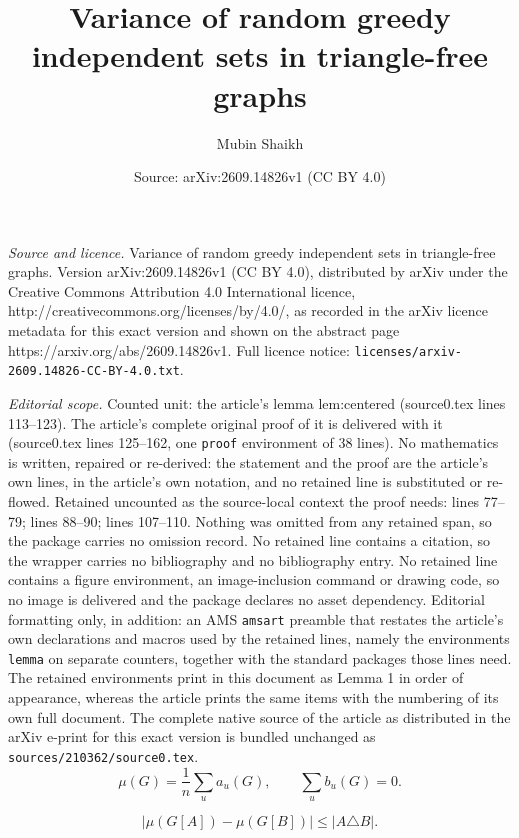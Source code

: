 \documentclass[10pt,a4paper]{amsart}
\title{Variance of random greedy independent sets in triangle-free graphs}
\author{Mubin Shaikh}
\date{Source: arXiv:2609.14826v1 (CC BY 4.0)}
\begin{document}
\maketitle

\noindent\emph{Source and licence.} Variance of random greedy independent sets in triangle-free graphs. Version arXiv:2609.14826v1 (CC BY 4.0), distributed by arXiv under the Creative Commons Attribution 4.0 International licence, http://creativecommons.org/licenses/by/4.0/, as recorded in the arXiv licence metadata for this exact version and shown on the abstract page https://arxiv.org/abs/2609.14826v1. Full licence notice: \texttt{licenses/arxiv-2609.14826-CC-BY-4.0.txt}.\par\smallskip

\noindent\textit{Editorial scope.} Counted unit: the article's lemma lem:centered (source0.tex lines 113--123). The article's complete original proof of it is delivered with it (source0.tex lines 125--162, one \texttt{proof} environment of 38 lines). No mathematics is written, repaired or re-derived: the statement and the proof are the article's own lines, in the article's own notation, and no retained line is substituted or re-flowed.  Retained uncounted as the source-local context the proof needs: lines 77--79; lines 88--90; lines 107--110.  Nothing was omitted from any retained span, so the package carries no omission record.  No retained line contains a citation, so the wrapper carries no bibliography and no bibliography entry.  No retained line contains a figure environment, an image-inclusion command or drawing code, so no image is delivered and the package declares no asset dependency.  Editorial formatting only, in addition: an AMS \texttt{amsart} preamble that restates the article's own declarations and macros used by the retained lines, namely the environments \texttt{lemma} on separate counters, together with the standard packages those lines need.  The retained environments print in this document as Lemma 1 in order of appearance, whereas the article prints the same items with the numbering of its own full document.  The complete native source of the article as distributed in the arXiv e-print for this exact version is bundled unchanged as \texttt{sources/210362/source0.tex}.
\begin{equation}\label{eq:mean}
 \mu(G)=\frac1n\sum_u a_u(G),\qquad \sum_u b_u(G)=0.
\end{equation}

\begin{equation}\label{eq:lipschitz}
 |\mu(G[A])-\mu(G[B])|\le |A\triangle B|.
\end{equation}
\end{document}
